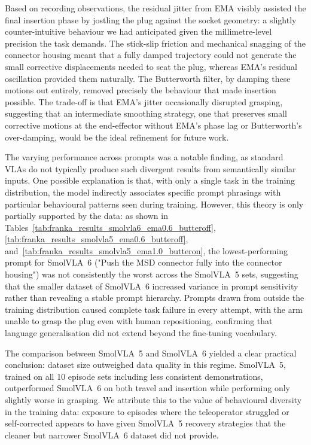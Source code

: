 \documentclass[conference]{IEEEtran}
\begin{document}
Based on recording observations, the residual jitter from EMA visibly assisted the final insertion phase by jostling the plug against the socket geometry: a slightly counter-intuitive behaviour we had anticipated given the millimetre-level precision the task demands. The stick-slip friction and mechanical snagging of the connector housing meant that a fully damped trajectory could not generate the small corrective displacements needed to seat the plug, whereas EMA's residual oscillation provided them naturally. The Butterworth filter, by damping these motions out entirely, removed precisely the behaviour that made insertion possible. The trade-off is that EMA's jitter occasionally disrupted grasping, suggesting that an intermediate smoothing strategy, one that preserves small corrective motions at the end-effector without EMA's phase lag or Butterworth's over-damping, would be the ideal refinement for future work.

The varying performance across prompts was a notable finding, as standard VLAs do not typically produce such divergent results from semantically similar inputs. One possible explanation is that, with only a single task in the training distribution, the model indirectly associates specific prompt phrasings with particular behavioural patterns seen during training. However, this theory is only partially supported by the data: as shown in Tables~\ref{tab:franka_results_smolvla6_ema0.6_butteroff}, \ref{tab:franka_results_smolvla5_ema0.6_butteroff}, and~\ref{tab:franka_results_smolvla5_ema1.0_butteron}, the lowest-performing prompt for SmolVLA~6 ("Push the MSD connector fully into the connector housing") was not consistently the worst across the SmolVLA~5 sets, suggesting that the smaller dataset of SmolVLA~6 increased variance in prompt sensitivity rather than revealing a stable prompt hierarchy. Prompts drawn from outside the training distribution caused complete task failure in every attempt, with the arm unable to grasp the plug even with human repositioning, confirming that language generalisation did not extend beyond the fine-tuning vocabulary.


The comparison between SmolVLA~5 and SmolVLA~6 yielded a clear practical conclusion: dataset size outweighed data quality in this regime. SmolVLA~5, trained on all 10 episode sets including less consistent demonstrations, outperformed SmolVLA~6 on both travel and insertion while performing only slightly worse in grasping. We attribute this to the value of behavioural diversity in the training data: exposure to episodes where the teleoperator struggled or self-corrected appears to have given SmolVLA~5 recovery strategies that the cleaner but narrower SmolVLA~6 dataset did not provide.
\end{document}
